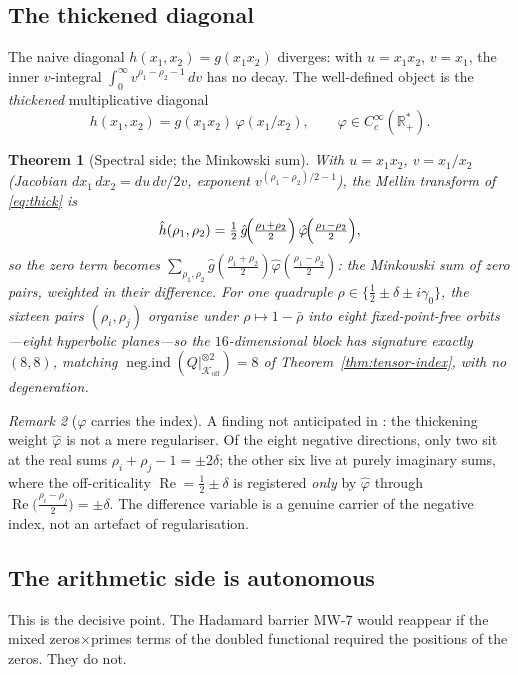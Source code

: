 \documentclass[11pt]{amsart}
\newtheorem{theorem}{Theorem}[section]
\theoremstyle{definition}
\theoremstyle{remark}
\newtheorem{remark}[theorem]{Remark}
\newcommand{\bbR}{\mathbb{R}}
\newcommand{\Koff}{\mathcal{K}_{\mathrm{off}}}
\newcommand{\negind}{\operatorname{neg.ind}}
\DeclareMathOperator{\Real}{Re}
\begin{document}
\subsection{The thickened diagonal}
The naive diagonal $h(x_1,x_2)=g(x_1x_2)$ diverges: with $u=x_1x_2$,
$v=x_1$, the inner $v$-integral $\int_0^\infty v^{\rho_1-\rho_2-1}\,dv$ has
no decay. The well-defined object is the \emph{thickened} multiplicative
diagonal
\begin{equation}\label{eq:thick}
h(x_1,x_2)=g(x_1x_2)\,\varphi(x_1/x_2),\qquad
\varphi\in C_c^\infty(\bbR_+^*).
\end{equation}

\begin{theorem}[Spectral side; the Minkowski sum]\label{thm:signature}
With $u=x_1x_2$, $v=x_1/x_2$ (Jacobian $dx_1\,dx_2=du\,dv/2v$, exponent
$v^{(\rho_1-\rho_2)/2-1}$), the Mellin transform of \eqref{eq:thick} is
\[
\hat h(\rho_1,\rho_2)=\tfrac12\,\hat g\!\Bigl(\tfrac{\rho_1+\rho_2}{2}\Bigr)\,
\hat\varphi\!\Bigl(\tfrac{\rho_1-\rho_2}{2}\Bigr),
\]
so the zero term becomes $\sum_{\rho_1,\rho_2}\hat g(\tfrac{\rho_1+\rho_2}{2})
\hat\varphi(\tfrac{\rho_1-\rho_2}{2})$: the Minkowski sum of zero pairs,
weighted in their difference. For one quadruple
$\rho\in\{\tfrac12\pm\delta\pm i\gamma_0\}$, the sixteen pairs
$(\rho_i,\rho_j)$ organise under $\rho\mapsto1-\bar\rho$ into eight
fixed-point-free orbits---eight hyperbolic planes---so the
$16$-dimensional block has signature exactly $(8,8)$, matching
$\negind(Q|_{\Koff}^{\otimes2})=8$ of Theorem~\ref{thm:tensor-index}, with
no degeneration.
\end{theorem}

\begin{remark}[$\varphi$ carries the index]
A finding not anticipated in \cite{P41,P40}: the thickening weight
$\hat\varphi$ is not a mere regulariser. Of the eight negative directions,
only two sit at the real sums $\rho_i+\rho_j-1=\pm2\delta$; the other six
live at purely imaginary sums, where the off-criticality $\Real=\tfrac12\pm\delta$
is registered \emph{only} by $\hat\varphi$ through $\Real\bigl(\tfrac{\rho_i-\rho_j}{2}\bigr)=\pm\delta$.
The difference variable is a genuine carrier of the negative index, not an
artefact of regularisation.
\end{remark}

\subsection{The arithmetic side is autonomous}
This is the decisive point. The Hadamard barrier MW-7 would reappear if the
mixed zeros$\times$primes terms of the doubled functional required the
positions of the zeros. They do not.
\end{document}
